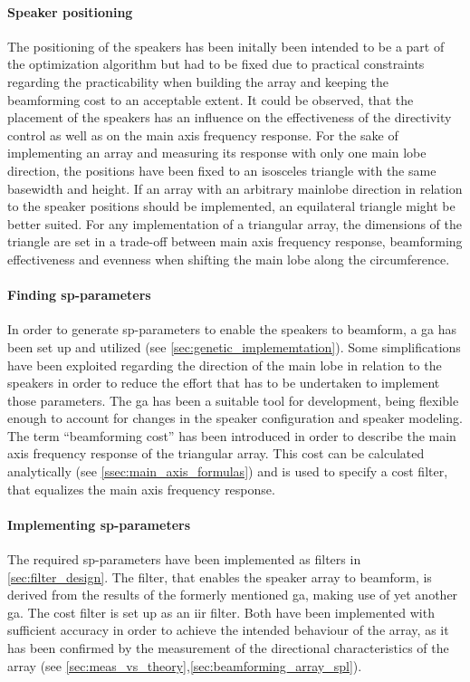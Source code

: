 \paragraph{Speaker positioning}
The positioning of the speakers has been initally been intended to be a part of the optimization algorithm but had to be fixed due to practical constraints regarding the practicability when building the array and keeping the beamforming cost to an acceptable extent. It could be observed, that the placement of the speakers has an influence on the effectiveness of the directivity control as well as on the main axis frequency response. For the sake of implementing an array and measuring its response with only one main lobe direction, the positions have been fixed to an isosceles triangle with the same basewidth and height. If an array with an arbitrary mainlobe direction in relation to the speaker positions should be implemented, an equilateral triangle might be better suited. For any implementation of a triangular array, the dimensions of the triangle are set in a trade-off between main axis frequency response, beamforming effectiveness and evenness when shifting the main lobe along the circumference.
\paragraph{Finding \gls{sp}-parameters}
In order to generate \gls{sp}-parameters to enable the speakers to beamform, a \gls{ga} has been set up and utilized (see \autoref{sec:genetic_implememtation}). Some simplifications have been exploited regarding the direction of the main lobe in relation to the speakers in order to reduce the effort that has to be undertaken to implement those parameters. The \gls{ga} has been a suitable tool for development, being flexible enough to account for changes in the speaker configuration and speaker modeling.\\
The term ``beamforming cost'' has been introduced in order to describe the main axis frequency response of the triangular array. This cost can be calculated analytically (see \autoref{ssec:main_axis_formulas}) and is used to specify a cost filter, that equalizes the main axis frequency response.
\paragraph{Implementing \gls{sp}-parameters}
The required \gls{sp}-parameters have been implemented as filters in \autoref{sec:filter_design}. The filter, that enables the speaker array to beamform, is derived from the results of the formerly mentioned \gls{ga}, making use of yet another \gls{ga}. The cost filter is set up as an \gls{iir} filter. Both have been implemented with sufficient accuracy in order to achieve the intended behaviour of the array, as it has been confirmed by the measurement of the directional characteristics of the array (see \autoref{sec:meas_vs_theory},\autoref{sec:beamforming_array_spl}). 
